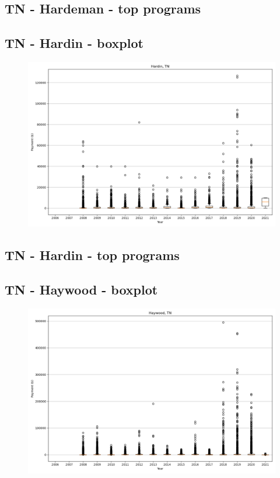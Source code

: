 \subsection*{TN - Hardeman - top programs}

\newpage
\subsection*{TN - Hardin - boxplot}
\begin{figure}[h]
\centering
\includegraphics[width=7in]{../output/boxplots/counties/Hardin-TN_boxplot.png}
\end{figure}


\subsection*{TN - Hardin - top programs}

\newpage
\subsection*{TN - Haywood - boxplot}
\begin{figure}[h]
\centering
\includegraphics[width=7in]{../output/boxplots/counties/Haywood-TN_boxplot.png}
\end{figure}


